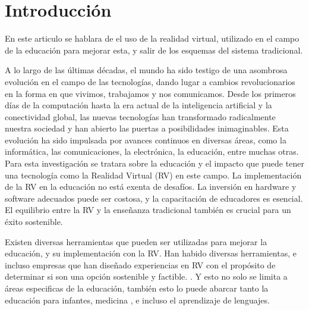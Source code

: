 \section{Introducción}

En este articulo se hablara de el uso de la realidad virtual, utilizado en el campo de la educación para mejorar esta, y salir de los esquemas del sistema tradicional.

A lo largo de las últimas décadas, el mundo ha sido testigo de una asombrosa evolución en el campo de las tecnologías, dando lugar a cambios revolucionarios en la forma en que vivimos, trabajamos y nos comunicamos. Desde los primeros días de la computación hasta la era actual de la inteligencia artificial y la conectividad global, las nuevas tecnologías han transformado radicalmente nuestra sociedad y han abierto las puertas a posibilidades inimaginables. Esta evolución ha sido impulsada por avances continuos en diversas áreas, como la informática, las comunicaciones, la electrónica, la educación, entre muchas otras. Para esta investigación se tratara sobre la educación y el impacto que puede tener una tecnología como la Realidad Virtual (RV) en este campo. La implementación de la RV en la educación no está exenta de desafíos. La inversión en hardware y software adecuados puede ser costosa, y la capacitación de educadores es esencial. El equilibrio entre la RV y la enseñanza tradicional también es crucial para un éxito sostenible.

Existen diversas herramientas que pueden ser utilizadas para mejorar la educación, y su implementación con la RV. Han habido diversas herramientas, e incluso empresas que han diseñado experiencias en RV con el propósito de determinar si son una opción sostenible y factible. \cite{SHIM2023100010}. Y esto no solo se limita a áreas especificas de la educación, también esto lo puede abarcar tanto la educación para infantes, medicina \cite{GUERRERO2022100002}, e incluso el aprendizaje de lenguajes. \cite{YUDINTSEVA2023100018, ZAMMIT2023100035}

%

%
